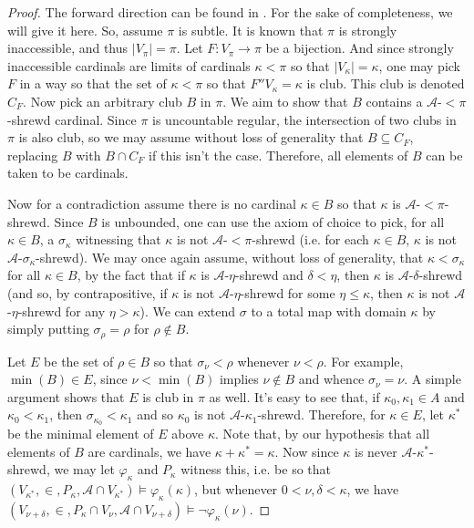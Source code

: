 \documentclass{article}
\theoremstyle{definition}
\theoremstyle{plain}
\theoremstyle{plain}
\theoremstyle{plain}
\theoremstyle{plain}
\theoremstyle{remark}
\theoremstyle{remark}
\theoremstyle{remark}
\theoremstyle{plain}
\theoremstyle{plain}
\theoremstyle{plain}
\begin{document}
\begin{proof}
The forward direction can be found in \cite{rathjen2}. For the sake of completeness, we will give it here. So, assume $\pi$ is subtle. It is known that $\pi$ is strongly inaccessible, and thus $|V_\pi| = \pi$. Let $F: V_\pi \to \pi$ be a bijection. And since strongly inaccessible cardinals are limits of cardinals $\kappa < \pi$ so that $|V_\kappa| = \kappa$, one may pick $F$ in a way so that the set of $\kappa < \pi$ so that $F''V_\kappa = \kappa$ is club. This club is denoted $C_F$. Now pick an arbitrary club $B$ in $\pi$. We aim to show that $B$ contains a $\mathcal{A}$-$< \pi$-shrewd cardinal. Since $\pi$ is uncountable regular, the intersection of two clubs in $\pi$ is also club, so we may assume without loss of generality that $B \subseteq C_F$, replacing $B$ with $B \cap C_F$ if this isn't the case. Therefore, all elements of $B$ can be taken to be cardinals.

Now for a contradiction assume there is no cardinal $\kappa \in B$ so that $\kappa$ is $\mathcal{A}$-$< \pi$-shrewd. Since $B$ is unbounded, one can use the axiom of choice to pick, for all $\kappa \in B$, a $\sigma_\kappa$ witnessing that $\kappa$ is not $\mathcal{A}$-$< \pi$-shrewd (i.e. for each $\kappa \in B$, $\kappa$ is not $\mathcal{A}$-$\sigma_\kappa$-shrewd). We may once again assume, without loss of generality, that $\kappa < \sigma_\kappa$ for all $\kappa \in B$, by the fact that if $\kappa$ is $\mathcal{A}$-$\eta$-shrewd and $\delta < \eta$, then $\kappa$ is $\mathcal{A}$-$\delta$-shrewd (and so, by contrapositive, if $\kappa$ is not $\mathcal{A}$-$\eta$-shrewd for some $\eta \leq \kappa$, then $\kappa$ is not $\mathcal{A}$-$\eta$-shrewd for any $\eta > \kappa$). We can extend $\sigma$ to a total map with domain $\kappa$ by simply putting $\sigma_\rho = \rho$ for $\rho \notin B$.

Let $E$ be the set of $\rho \in B$ so that $\sigma_\nu < \rho$ whenever $\nu < \rho$. For example, $\min(B) \in E$, since $\nu < \min(B)$ implies $\nu \notin B$ and whence $\sigma_\nu = \nu$. A simple argument shows that $E$ is club in $\pi$ as well. It's easy to see that, if $\kappa_0, \kappa_1 \in A$ and $\kappa_0 < \kappa_1$, then $\sigma_{\kappa_0} < \kappa_1$ and so $\kappa_0$ is not $\mathcal{A}$-$\kappa_1$-shrewd. Therefore, for $\kappa \in E$, let $\kappa^*$ be the minimal element of $E$ above $\kappa$. Note that, by our hypothesis that all elements of $B$ are cardinals, we have $\kappa + \kappa^* = \kappa$. Now since $\kappa$ is never $\mathcal{A}$-$\kappa^*$-shrewd, we may let $\varphi_\kappa$ and $P_\kappa$ witness this, i.e. be so that $(V_{\kappa^*}, \in, P_\kappa, \mathcal{A} \cap V_{\kappa^*}) \models \varphi_\kappa(\kappa)$, but whenever $0 < \nu, \delta < \kappa$, we have $(V_{\nu+\delta}, \in, P_\kappa \cap V_\nu, \mathcal{A} \cap V_{\nu+\delta}) \models \neg \varphi_\kappa(\nu)$.


\end{proof}
\end{document}
